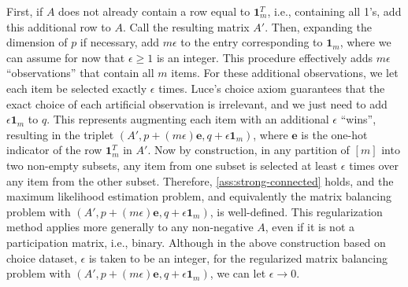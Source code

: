 First, if $A$ does not already contain a row equal to $\mathbf{1}_m^T$, i.e., containing all 1's, add this additional row to $A$. Call the resulting matrix $A'$. Then, expanding the dimension of $p$ if necessary, add $m\epsilon$ to the entry corresponding to $\mathbf{1}_m$, where we can assume for now that $\epsilon\geq 1$ is an integer.
This procedure effectively adds $m \epsilon$ ``observations'' that contain all $m$ items. For these additional observations, we let each item be selected exactly $\epsilon$ times. Luce's choice axiom guarantees that the exact choice of each artificial observation is irrelevant, and we just need to add $\epsilon \mathbf{1}_m$ to $q$. This represents augmenting each item with an additional $\epsilon$ ``wins'', resulting in the triplet $(A',p+(m\epsilon)\mathbf{e},q+\epsilon \mathbf{1}_m)$, where $\mathbf{e}$ is the one-hot indicator of the row $\mathbf{1}_m^T$ in $A'$. Now by construction, in any partition of $[m]$ into two non-empty subsets, any item from one subset is selected at least $\epsilon$ times over any item from the other subset. Therefore, \cref{ass:strong-connected} holds, and the maximum likelihood estimation problem, and equivalently the matrix balancing problem with $(A',p+(m\epsilon)\mathbf{e},q+\epsilon \mathbf{1}_m)$, is well-defined. This regularization method applies more generally to any non-negative $A$, even if it is not a participation matrix, i.e., binary. Although in the above construction based on choice dataset, $\epsilon$ is taken to be an integer, for the regularized matrix balancing problem with $(A',p+(m\epsilon)\mathbf{e},q+\epsilon \mathbf{1}_m)$, we can let $\epsilon \rightarrow 0$. %
